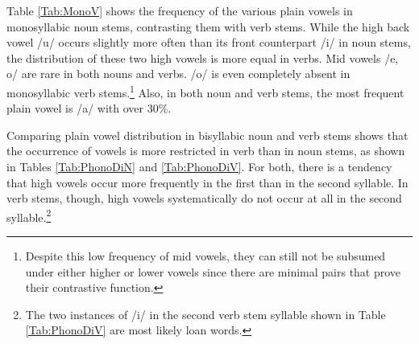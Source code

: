 Table \ref{Tab:MonoV} shows the frequency of the various plain vowels in monosyllabic noun stems, contrasting them with verb stems. While the high back vowel /u/ occurs slightly more often than its front counterpart /i/ in noun stems, the distribution of these two high vowels is more equal in verbs. Mid vowels /e, o/ are rare in both nouns and verbs. /o/ is even completely absent in monosyllabic verb stems.\footnote{Despite this low frequency of mid vowels, they can still not be subsumed under either higher or lower vowels since there are minimal pairs that prove their contrastive function.} Also, in both noun and verb stems, the most frequent plain vowel is /a/ with over 30\%.

Comparing plain vowel distribution in bisyllabic noun and verb stems shows that the occurrence of vowels is more restricted in verb than in noun stems, as shown in Tables \ref{Tab:PhonoDiN} and \ref{Tab:PhonoDiV}. For both, there is a tendency that high vowels occur more frequently in the first than in the second syllable. In verb stems, though, high vowels systematically do not occur at all in the second syllable.\footnote{The two instances of /i/ in the second verb stem syllable shown in Table \ref{Tab:PhonoDiV} are most likely loan words.}

\begin{table} 
\centering
{}
\caption{Phonotactics of vowels in bisyllabic noun stems}
\label{Tab:PhonoDiN}
\end{table}


